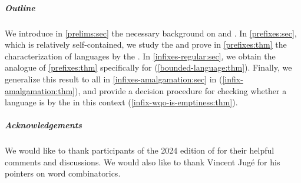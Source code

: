 \subparagraph{Outline} 
We introduce in \cref{prelims:sec} the
necessary background on  and .
In
\cref{prefixes:sec}, which is relatively
self-contained, we study the  and prove in
\cref{prefixes:thm} the characterization of 
languages by the . In
\cref{infixes-regular:sec}, we
obtain the  analogue of \cref{prefixes:thm}
specifically for 
(\cref{bounded-language:thm}). Finally, 
we generalize this result to all
 in \cref{infixes-amalgamation:sec}
in
(\cref{infix-amalgamation:thm}),
and provide a decision procedure for checking whether a language is
 by the  in
this context (\cref{infix-wqo-is-emptiness:thm}).

\subparagraph{Acknowledgements} We would like to thank participants of the 2024
edition of  for their helpful comments and discussions.
We would also like to thank Vincent Jugé for his pointers on word combinatorics.

